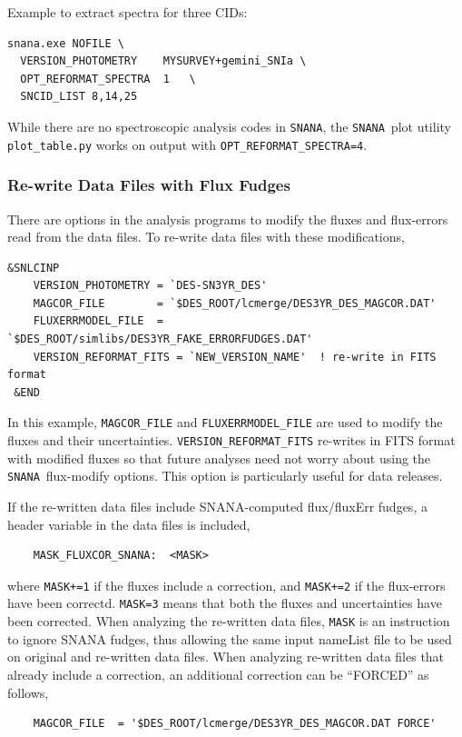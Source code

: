 \documentclass[12pt]{article}
\newcommand{\snana}{{\tt SNANA}}
\newcommand{\SNANA}{{\tt SNANA}}
\begin{document}
\noindent 
Example to extract spectra for three CIDs:
%
\begin{verbatim}      
snana.exe NOFILE \
  VERSION_PHOTOMETRY    MYSURVEY+gemini_SNIa \
  OPT_REFORMAT_SPECTRA  1   \
  SNCID_LIST 8,14,25
\end{verbatim}


While there are no spectroscopic analysis codes in \SNANA,
the \SNANA\ plot utility {\tt plot\_table.py} works on 
output with {\tt OPT\_REFORMAT\_SPECTRA=4}.

  \clearpage
  \subsubsection{Re-write Data Files with Flux Fudges}
  \label{sss:text2text}

There are options in the analysis programs to modify
the fluxes and flux-errors read from the data files. 
To re-write data files with these modifications,
%
\begin{Verbatim}[frame=single]
  &SNLCINP
    VERSION_PHOTOMETRY = `DES-SN3YR_DES'
    MAGCOR_FILE        = `$DES_ROOT/lcmerge/DES3YR_DES_MAGCOR.DAT'
    FLUXERRMODEL_FILE  = `$DES_ROOT/simlibs/DES3YR_FAKE_ERRORFUDGES.DAT'
    VERSION_REFORMAT_FITS = `NEW_VERSION_NAME'  ! re-write in FITS format
 &END
\end{Verbatim}
%
In this example, {\tt MAGCOR\_FILE} and {\tt FLUXERRMODEL\_FILE} 
are used to modify the fluxes and their uncertainties.
{\tt VERSION\_REFORMAT\_FITS} re-writes in FITS format with 
modified fluxes so that future analyses need not worry about
using the \snana\ flux-modify options. 
This option is particularly useful for data releases.

If the re-written data files include SNANA-computed flux/fluxErr fudges,
a header variable in the data files is included,
\begin{verbatim}
    MASK_FLUXCOR_SNANA:  <MASK>
\end{verbatim}
%
where {\tt MASK+=1} if the fluxes include a correction,
and {\tt MASK+=2} if the flux-errors have been correctd.
{\tt MASK=3} means that both the fluxes and uncertainties have
been corrected. When analyzing the re-written data files,
{\tt MASK} is an instruction to ignore SNANA fudges, thus
allowing the same input nameList file to be used on original
and re-written data files. When analyzing re-written data files
that already include a correction, an additional correction 
can be ``FORCED'' as follows,
%
\begin{verbatim}
    MAGCOR_FILE  = '$DES_ROOT/lcmerge/DES3YR_DES_MAGCOR.DAT FORCE'
\end{verbatim}
\end{document}
